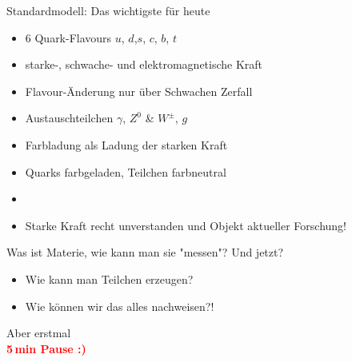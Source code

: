 \begin{frame}{Standardmodell: Das wichtigste für heute}
\begin{itemize}
    \item 6 Quark-Flavours  $u$, $d$,$s$, $c$, $b$, $t$
    \item starke-, schwache- und elektromagnetische Kraft
    \item Flavour-Änderung nur über Schwachen Zerfall
    \item Austauschteilchen $\gamma$, $Z^0$ \& $W^{\pm}$, $g$
    \item Farbladung als Ladung der starken Kraft
    \item Quarks farbgeladen, Teilchen farbneutral
    \item []
    \item[\ding{43}] Starke Kraft recht unverstanden und Objekt aktueller Forschung!
\end{itemize}
    
\end{frame}
  \begin{frame}{Was ist Materie, wie kann man sie "messen"?}\Large
 Und jetzt?
 \begin{itemize}
     \item Wie kann man Teilchen erzeugen?
     \item Wie können wir das alles nachweisen?!
 \end{itemize}
\begin{center} \pause
 
Aber erstmal \\   \textbf{\textcolor{red}{5\,min Pause :)}
}
\end{center}  
\end{frame}
